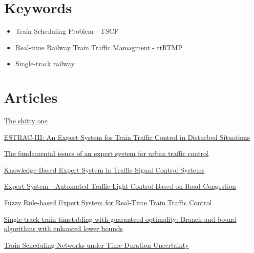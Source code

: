 \documentclass{article}
\begin{document}
\section*{Keywords}
\begin{itemize}
\item Train Scheduling Problem - TSCP

\item Real-time Railway Train Traffic Mamagment - rtRTMP

\item Single-track railway

\end{itemize}

\section*{Articles}

\href{https://www.researchgate.net/publication/289498910_Underground_mine_traffic_management_and_optimization_an_intelligent_application_based_on_a_real-time_localization_system}{
The shitty one}

\href{https://www.sciencedirect.com/science/article/pii/S1474667017526646}{ESTRAC-III: An Expert System for Train Traffic Control in Disturbed Situations}

\href{https://ieeexplore.ieee.org/document/208646/}{The fundamental issues of an expert system for urban traffic control}

\href{http://s-space.snu.ac.kr/bitstream/10371/90495/1/5.Knowledge-Based_Expert_System_in_Traffic_Signal_Control_Systems..pdf}{Knowledge-Based Expert System in Traffic Signal Control Systems}

\href{https://www.slideshare.net/KartikShenoy1/expert-system-automated-traffic-light-control-based-on-road-congestion}{Expert System    - Automated Traffic Light Control Based on Road Congestion}

\href{https://www.dcce.ibilce.unesp.br/~norian/cursos/mds/estudo_de_caso/FuzzyTrafficControl.pdf}{Fuzzy Rule-based Expert System for Real-Time Train Traffic Control}

\href{https://ac.els-cdn.com/S0191261506000737/1-s2.0-S0191261506000737-main.pdf?_tid=02dc28ac-ceb5-4ec5-a54e-4c6d32ce7c62&acdnat=1530008179_14f86ec30be353025bc8af4b00094329}{Single-track train timetabling with guaranteed
optimality: Branch-and-bound algorithms
with enhanced lower bounds}

\href{https://ac.els-cdn.com/S1474667016429964/1-s2.0-S1474667016429964-main.pdf?_tid=49dafe5b-e43e-4547-a208-aa569cc46102&acdnat=1530007982_2ba69d17cf5658abd4cfd09d4923408b}{Train Scheduling Networks under Time Duration Uncertainty}
\end{document}
